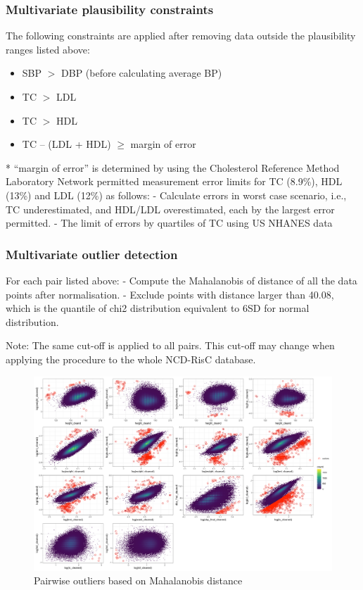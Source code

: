 \documentclass[12pt]{article}
\begin{document}
\begin{appendix}
    \subsubsection{Multivariate plausibility constraints}
    The following constraints are applied after removing data outside the plausibility ranges listed above:
    \begin{itemize}
        \item SBP $>$ DBP (before calculating average BP) 
        \item TC $>$ LDL 
        \item TC $>$ HDL
        \item TC – (LDL + HDL) $\geq$ margin of error
    \end{itemize}

* “margin of error” is determined by using the Cholesterol Reference Method Laboratory Network permitted measurement error limits for TC (8.9\%), HDL (13\%) and LDL (12\%) as follows:
-	Calculate errors in worst case scenario, i.e., TC underestimated, and HDL/LDL overestimated, each by the largest error permitted.
-	The limit of errors by quartiles of TC using US NHANES data

    \subsubsection{Multivariate outlier detection}

    For each pair listed above:
-	Compute the Mahalanobis of distance of all the data points after normalisation.
-	Exclude points with distance larger than 40.08, which is the quantile of chi2 distribution equivalent to 6SD for normal distribution.

Note: The same cut-off is applied to all pairs. This cut-off may change when applying the procedure to the whole NCD-RisC database.

\begin{figure}[H]
    \centering
    \includegraphics[width = \linewidth]{../3_figures/mahalanobis.png}
    \caption{Pairwise outliers based on Mahalanobis distance}
    \label{fig:pairs}
\end{figure}


\end{appendix}
\end{document}
